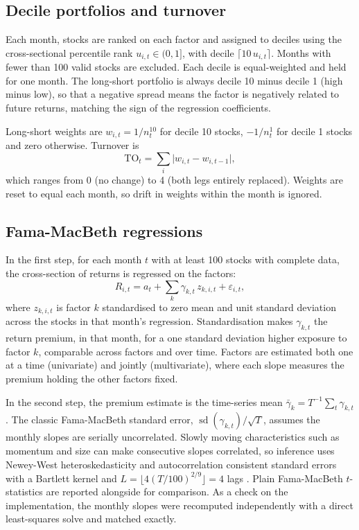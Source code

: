 \documentclass[11pt,a4paper]{article}
\begin{document}
\subsection{Decile portfolios and turnover}

Each month, stocks are ranked on each factor and assigned to deciles using the cross-sectional percentile rank $u_{i,t} \in (0,1]$, with decile $\lceil 10\,u_{i,t} \rceil$. Months with fewer than 100 valid stocks are excluded. Each decile is equal-weighted and held for one month. The long-short portfolio is always decile 10 minus decile 1 (high minus low), so that a negative spread means the factor is negatively related to future returns, matching the sign of the regression coefficients.

Long-short weights are $w_{i,t} = 1/n^{10}_t$ for decile 10 stocks, $-1/n^{1}_t$ for decile 1 stocks and zero otherwise. Turnover is
\begin{equation}
\text{TO}_t = \sum_i \big| w_{i,t} - w_{i,t-1} \big| ,
\end{equation}
which ranges from 0 (no change) to 4 (both legs entirely replaced). Weights are reset to equal each month, so drift in weights within the month is ignored.

\subsection{Fama-MacBeth regressions}

In the first step, for each month $t$ with at least 100 stocks with complete data, the cross-section of returns is regressed on the factors:
\begin{equation}
R_{i,t} = a_t + \sum_{k} \gamma_{k,t}\, z_{k,i,t} + \varepsilon_{i,t},
\end{equation}
where $z_{k,i,t}$ is factor $k$ standardised to zero mean and unit standard deviation across the stocks in that month's regression. Standardisation makes $\gamma_{k,t}$ the return premium, in that month, for a one standard deviation higher exposure to factor $k$, comparable across factors and over time. Factors are estimated both one at a time (univariate) and jointly (multivariate), where each slope measures the premium holding the other factors fixed.

In the second step, the premium estimate is the time-series mean $\bar\gamma_k = T^{-1}\sum_t \gamma_{k,t}$. The classic Fama-MacBeth standard error, $\operatorname{sd}(\gamma_{k,t})/\sqrt{T}$, assumes the monthly slopes are serially uncorrelated. Slowly moving characteristics such as momentum and size can make consecutive slopes correlated, so inference uses Newey-West heteroskedasticity and autocorrelation consistent standard errors \citep{newey1987} with a Bartlett kernel and $L = \lfloor 4 (T/100)^{2/9} \rfloor = 4$ lags \citep{newey1994}. Plain Fama-MacBeth $t$-statistics are reported alongside for comparison. As a check on the implementation, the monthly slopes were recomputed independently with a direct least-squares solve and matched exactly.
\end{document}
